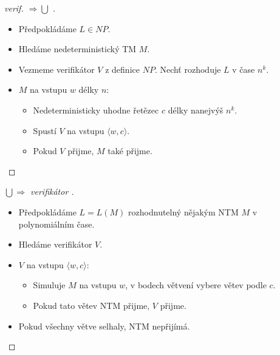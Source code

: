     \begin{frame}
    \begin{proof}[verif. $\Rightarrow \bigcup$ ]
    \begin{itemize}
        \item Předpokládáme $L\in NP$.
        \item Hledáme nedeterministický TM $M$.
        \item Vezmeme verifikátor $V$ z definice $NP$. Nechť rozhoduje $L$ v čase $n^k$.
        \item $M$ na vstupu $w$ délky $n$:
        
        \begin{itemize}
            \item Nedeterministicky uhodne řetězec $c$ délky nanejvýš $n^k$.
            \item Spustí $V$ na vstupu $\langle w, c\rangle$.
    \item Pokud $V$ přijme, $M$ také přijme.
        \end{itemize}
    \end{itemize}
    \end{proof}
    \pause
    \begin{proof}[ $\bigcup\Rightarrow $ verifikátor ]
    \begin{itemize}
        \item Předpokládáme $L=L(M)$ rozhodnutelný nějakým NTM $M$ v polynomiálním čase.
        \item Hledáme verifikátor $V$.
        \item $V$ na vstupu $\langle w, c\rangle$:
        
        \begin{itemize}
            \item Simuluje $M$ na vstupu $w$, v bodech větvení vybere větev podle $c$.
    \item Pokud tato větev NTM přijme, $V$ přijme.
        \end{itemize}
     \item Pokud všechny větve selhaly, NTM nepřijímá.
    \end{itemize}
    \end{proof}
    \end{frame}
    
    
    
    
    

